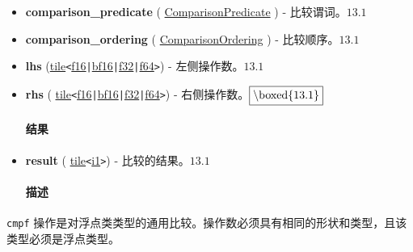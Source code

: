 \documentclass{article}
\begin{document}
\begin{itemize}
\item \textbf{comparison\_predicate} ( \href{https://docs.nvidia.com/cuda/tile-ir/latest/sections/operations.html#op-attribute-cuda-tile-cmpf-comparisonpredicate-attr}{ComparisonPredicate} ) - 比较谓词。$\boxed{13.1}$
\item \textbf{comparison\_ordering} ( \href{https://docs.nvidia.com/cuda/tile-ir/latest/sections/operations.html#op-attribute-cuda-tile-cmpf-comparisonordering-attr}{ComparisonOrdering} ) - 比较顺序。$\boxed{13.1}$
\item \textbf{lhs} (\href{https://docs.nvidia.com/cuda/tile-ir/latest/sections/types.html#type-tile}{tile}\texttt{<}\href{https://docs.nvidia.com/cuda/tile-ir/latest/sections/types.html#subsection-element-types}{f16}\texttt{|}\href{https://docs.nvidia.com/cuda/tile-ir/latest/sections/types.html#subsection-element-types}{bf16}\texttt{|}\href{https://docs.nvidia.com/cuda/tile-ir/latest/sections/types.html#subsection-element-types}{f32}\texttt{|}\href{https://docs.nvidia.com/cuda/tile-ir/latest/sections/types.html#subsection-element-types}{f64}\texttt{>}) - 左侧操作数。$\boxed{13.1}$
\item \textbf{rhs} ( \href{https://docs.nvidia.com/cuda/tile-ir/latest/sections/types.html#type-tile}{tile}\texttt{<}\href{https://docs.nvidia.com/cuda/tile-ir/latest/sections/types.html#subsection-element-types}{f16}\texttt{|}\href{https://docs.nvidia.com/cuda/tile-ir/latest/sections/types.html#subsection-element-types}{bf16}\texttt{|}\href{https://docs.nvidia.com/cuda/tile-ir/latest/sections/types.html#subsection-element-types}{f32}\texttt{|}\href{https://docs.nvidia.com/cuda/tile-ir/latest/sections/types.html#subsection-element-types}{f64}\texttt{>}) - 右侧操作数。$\boxed{$\textbackslash{}boxed\{13.1\}$}$


\paragraph{结果}

\item \textbf{result} ( \href{https://docs.nvidia.com/cuda/tile-ir/latest/sections/types.html#type-tile}{tile}\texttt{<}\href{https://docs.nvidia.com/cuda/tile-ir/latest/sections/types.html#subsection-element-types}{i1}\texttt{>}) - 比较的结果。$\boxed{13.1}$


\paragraph{描述}

\end{itemize}
\texttt{cmpf} 操作是对浮点类类型的通用比较。操作数必须具有相同的形状和类型，且该类型必须是浮点类型。
\end{document}
